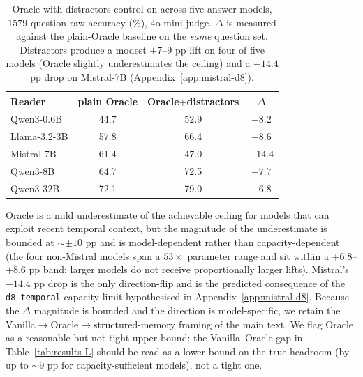 \begin{table}[h]
\centering
\small
\caption{Oracle-with-distractors control on \benchL across five answer models, $1579$-question raw accuracy (\%), 4o-mini judge. $\Delta$ is measured against the plain-Oracle baseline on the \emph{same} question set. Distractors produce a modest $+7$--$9$ pp lift on four of five models (Oracle slightly underestimates the ceiling) and a $-14.4$ pp drop on Mistral-7B (Appendix~\ref{app:mistral-d8}).}
\label{tab:review4-oracle-dist}
\begin{tabular}{lccc}
\toprule
Reader & plain Oracle & Oracle$+$distractors & $\Delta$ \\
\midrule
Qwen3-0.6B    & 44.7 & 52.9 & $+8.2$ \\
Llama-3.2-3B  & 57.8 & 66.4 & $+8.6$ \\
Mistral-7B    & 61.4 & 47.0 & $\mathbf{-14.4}$ \\
Qwen3-8B      & 64.7 & 72.5 & $+7.7$ \\
Qwen3-32B     & 72.1 & 79.0 & $+6.8$ \\
\bottomrule
\end{tabular}
\end{table}

Oracle is a mild underestimate of the achievable ceiling for models that can exploit recent temporal context, but the magnitude of the underestimate is bounded at ${\sim}\pm 10$ pp and is model-dependent rather than capacity-dependent (the four non-Mistral models span a $53\times$ parameter range and sit within a $+6.8$--$+8.6$ pp band; larger models do not receive proportionally larger lifts). Mistral's $-14.4$ pp drop is the only direction-flip and is the predicted consequence of the \texttt{d8\_temporal} capacity limit hypothesised in Appendix~\ref{app:mistral-d8}. Because the $\Delta$ magnitude is bounded and the direction is model-specific, we retain the Vanilla$\to$Oracle$\to$structured-memory framing of the main text. We flag Oracle as a reasonable but not tight upper bound: the Vanilla--Oracle gap in Table~\ref{tab:results-L} should be read as a lower bound on the true headroom (by up to ${\sim}\!9$ pp for capacity-sufficient models), not a tight one.

